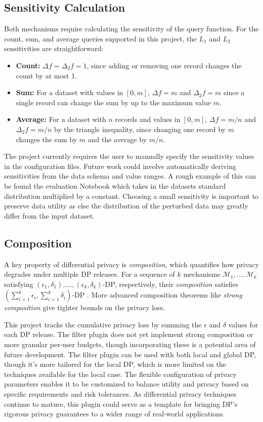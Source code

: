 \subsection{Sensitivity Calculation}
Both mechanisms require calculating the sensitivity of the query function. For the count, sum, and average queries supported in this project, the $L_1$ and $L_2$ sensitivities are straightforward:
\begin{itemize}
    \item \textbf{Count:} $\Delta f = \Delta_2 f = 1$, since adding or removing one record changes the count by at most 1.
    \item \textbf{Sum:} For a dataset with values in $[0, m]$, $\Delta f = m$ and $\Delta_2 f = m$ since a single record can change the sum by up to the maximum value $m$.
    \item \textbf{Average:} For a dataset with $n$ records and values in $[0,m]$, $\Delta f = m/n$ and $\Delta_2 f = m/n$ by the triangle inequality, since changing one record by $m$ changes the sum by $m$ and the average by $m/n$.
\end{itemize}
The project currently requires the user to manually specify the sensitivity values in the configuration files. Future work could involve automatically deriving sensitivities from the data schema and value ranges. A rough example of this can be found the evaluation Notebook which takes in the datasets standard distribution multiplied by a constant. Choosing a small sensitivity is important to preserve data utility as else the distribution of the perturbed data may greatly differ from the input dataset.

\subsection{Composition}
A key property of differential privacy is \textit{composition}, which quantifies how privacy degrades under multiple DP releases. For a sequence of $k$ mechanisms $\mathcal{M}_1, \ldots, \mathcal{M}_k$ satisfying $(\epsilon_1, \delta_1), \ldots, (\epsilon_k, \delta_k)$-DP, respectively, their \textit{composition} satisfies $(\sum_{i=1}^k \epsilon_i, \sum_{i=1}^k \delta_i)$-DP \citep[Thm. 3.16]{Dwork2014}. More advanced composition theorems like \textit{strong composition} \citep[Thm. 3.20]{Dwork2014} give tighter bounds on the privacy loss.

This project tracks the cumulative privacy loss by summing the $\epsilon$ and $\delta$ values for each DP release. The filter plugin does not yet implement strong composition or more granular per-user budgets, though incorporating these is a potential area of future development. The filter plugin can be used with both local and global DP, though it's more tailored for the local DP, which is more limited on the techniques available for the local case. The flexible configuration of privacy parameters enables it to be customized to balance utility and privacy based on specific requirements and risk tolerances. As differential privacy techniques continue to mature, this plugin could serve as a template for bringing DP's rigorous privacy guarantees to a wider range of real-world applications.
